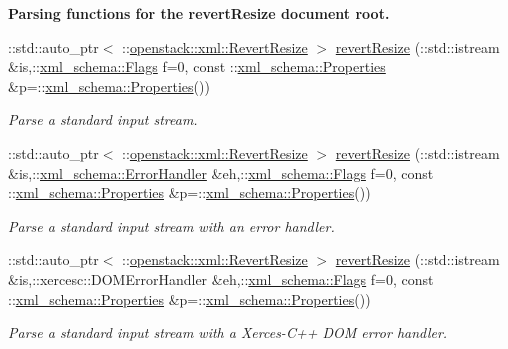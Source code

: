 \begin{Indent}{\bf Parsing functions for the revertResize document root.}
\begin{DoxyCompactItemize}
::std::auto\_\-ptr$<$ ::\hyperlink{classopenstack_1_1xml_1_1RevertResize}{openstack::xml::RevertResize} $>$ \hyperlink{namespaceopenstack_1_1xml_ae46eb0e7e63ed001831b62695a4f497a}{revertResize} (::std::istream \&is,::\hyperlink{namespacexml__schema_affb4c227cbd9aa7453dd1dc5a1401943}{xml\_\-schema::Flags} f=0, const ::\hyperlink{namespacexml__schema_ad27ce19a7ee1d3b1064092648898f64c}{xml\_\-schema::Properties} \&p=::\hyperlink{namespacexml__schema_ad27ce19a7ee1d3b1064092648898f64c}{xml\_\-schema::Properties}())
\begin{DoxyCompactList}\small\item\em Parse a standard input stream. \item\end{DoxyCompactList}\item 
::std::auto\_\-ptr$<$ ::\hyperlink{classopenstack_1_1xml_1_1RevertResize}{openstack::xml::RevertResize} $>$ \hyperlink{namespaceopenstack_1_1xml_a37219ce46906ca7bbfad5c07302d9e60}{revertResize} (::std::istream \&is,::\hyperlink{namespacexml__schema_ab1c9361bfd3b404eaabf0c31eded79dc}{xml\_\-schema::ErrorHandler} \&eh,::\hyperlink{namespacexml__schema_affb4c227cbd9aa7453dd1dc5a1401943}{xml\_\-schema::Flags} f=0, const ::\hyperlink{namespacexml__schema_ad27ce19a7ee1d3b1064092648898f64c}{xml\_\-schema::Properties} \&p=::\hyperlink{namespacexml__schema_ad27ce19a7ee1d3b1064092648898f64c}{xml\_\-schema::Properties}())
\begin{DoxyCompactList}\small\item\em Parse a standard input stream with an error handler. \item\end{DoxyCompactList}\item 
::std::auto\_\-ptr$<$ ::\hyperlink{classopenstack_1_1xml_1_1RevertResize}{openstack::xml::RevertResize} $>$ \hyperlink{namespaceopenstack_1_1xml_a875a2092ad035fdd2f9f82969be504d2}{revertResize} (::std::istream \&is,::xercesc::DOMErrorHandler \&eh,::\hyperlink{namespacexml__schema_affb4c227cbd9aa7453dd1dc5a1401943}{xml\_\-schema::Flags} f=0, const ::\hyperlink{namespacexml__schema_ad27ce19a7ee1d3b1064092648898f64c}{xml\_\-schema::Properties} \&p=::\hyperlink{namespacexml__schema_ad27ce19a7ee1d3b1064092648898f64c}{xml\_\-schema::Properties}())
\begin{DoxyCompactList}\small\item\em Parse a standard input stream with a Xerces-\/C++ DOM error handler. \item\end{DoxyCompactList}\item 

\end{DoxyCompactItemize}
\end{Indent}
